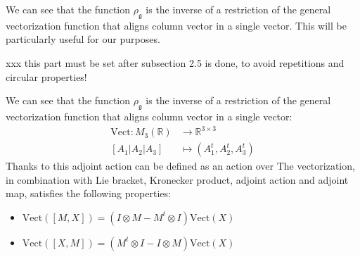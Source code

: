 
We can see that the function $\rho_{\mathfrak{g}}$ is the inverse of a restriction of the general vectorization function that aligns column vector in a single vector. This will be particularly useful for our purposes.




\noindent
xxx this part must be set after subsection 2.5 is done, to avoid repetitions and circular properties!

\noindent
We can see that the function $\rho_{\mathfrak{g}}$ is the inverse of a restriction of the general vectorization function that aligns column vector in a single vector:
\begin{align*}
\text{Vect} : M_{3}(\mathbb{R}) & \longrightarrow \mathbb{R}^{3\times 3}  \\
[A_1 \big| A_2  \big| A_3]
&\longmapsto  
(A_1^{t}, A_2^{t} , A_3^{t})
\end{align*}
Thanks to this adjoint action can be defined as an action over 
The vectorization, in combination with Lie bracket, Kronecker product, adjoint action and adjoint map, satisfies the following properties:
\begin{itemize}
	\item $\text{Vect} ([M,X]) =  (I\otimes M - M^{t}\otimes I)\text{Vect} (X) $
	\item $\text{Vect} ([X,M]) = (M^{t}\otimes I - I\otimes M)\text{Vect} (X) $
\end{itemize}

